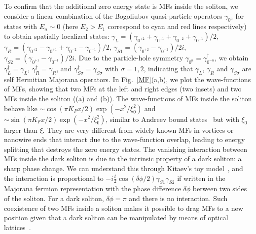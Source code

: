 \documentclass[prl,aps,twocolumn,showpacs, floatfix]{revtex4}
\begin{document}
To confirm that the additional zero energy state is MFs inside the soliton,
we consider a linear combination of the Bogoliubov quasi-particle operators $%
\gamma _{0^{n}}$ for states with $E_{n}\sim 0$ (here $E_{2}>E_{1}$
correspond to cyan and red lines respectively) to obtain spatially localized
states: $\gamma _{L}=(\gamma _{0^{+2}}+\gamma _{0^{+1}}+\gamma
_{0^{-2}}+\gamma _{0^{-1}})/2$, $\gamma _{R}=(\gamma _{0^{+2}}-\gamma
_{0^{+1}}+\gamma _{0^{-2}}-\gamma _{0^{-1}})/2$, $\gamma _{S1}=(\gamma
_{0^{+2}}-\gamma _{0^{-2}})/2i$, $\gamma _{S2}=(\gamma _{0^{+1}}-\gamma
_{0^{-1}})/2i$. Due to the particle-hole symmetry $\gamma _{0^{n}}=\gamma
_{0^{-n}}^{\dagger }$, we obtain $\gamma _{L}^{\dagger }=\gamma _{L}$, $%
\gamma _{R}^{\dagger }=\gamma _{R}$, and $\gamma _{S\sigma }^{\dagger
}=\gamma _{S\sigma }$ with $\sigma =1,2$, indicating that $\gamma _{L}$, $%
\gamma _{R}$ and $\gamma _{S\sigma }$ are self Hermitian Majorana operators.
In Fig.~\ref{MF}(a,b), we plot the wave-functions of MFs, showing that two
MFs at the left and right edges (two insets) and two MFs inside the soliton
((a) and (b)). The wave-functions of MFs inside the soliton behave like $%
\sim \cos (\pi K_{F}x/2)\exp (-x^{2}/\xi _{0}^{2})$ and $\sim \sin (\pi
K_{F}x/2)\exp (-x^{2}/\xi _{0}^{2})$, similar to Andreev bound states~\cite%
{Stringari2007PRA} but with $\xi _{0}$ larger than $\xi $. They are very
different from widely known MFs in vortices or nanowire ends that interact
due to the wave-function overlap, leading to energy splitting that destroys
the zero energy states. The vanishing interaction between MFs inside the
dark soliton is due to the intrinsic property of a dark soliton: a sharp
phase change. We can understand this through Kitaev's toy model~\cite%
{Kitaev2001}, and the interaction is proportional to $-i\frac{t}{2}\cos
(\delta \phi /2)\gamma _{S1}\gamma _{S2}$ if written in the Majorana fermion
representation with the phase difference $\delta \phi $ between two sides of
the soliton. For a dark soliton, $\delta \phi =\pi $ and there is no
interaction. Such coexistence of two MFs inside a soliton makes it possible
to drag MFs to a new position given that a dark soliton can be manipulated
by means of optical lattices~\cite{Theocharis2005PRE}.
\end{document}

